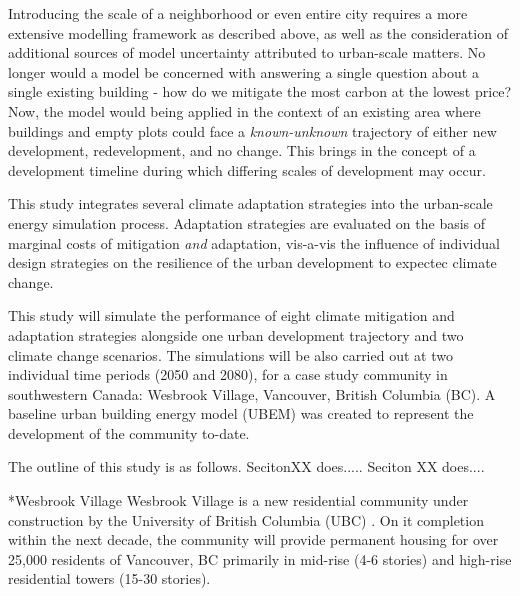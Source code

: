 \documentclass[twocolumn, a4paper,10pt]{article}
\makeatletter
\renewcommand\subsection{\@startsection{subsection}{1}{\z@}{\z@}{\z@}{\normalfont\normalsize\bfseries}}
\renewcommand\subsection{\@startsection{subsection}{1}{\z@}{\z@}{0.1pt}{\normalfont\normalsize\bfseries}}
\makeatother
\begin{document}
Introducing the scale of a neighborhood or even entire city requires a more extensive modelling framework as described above, as well as the consideration of additional sources of model uncertainty attributed to urban-scale matters. No longer would a model be concerned with answering a single question about a single existing building - how do we mitigate the most carbon at the lowest price? Now, the model would  being applied in the context of an existing area where buildings and empty plots could face a \textit{known-unknown} trajectory of either new development, redevelopment, and no change. This brings in the concept of a development timeline during which differing scales of development may occur.

This study integrates several climate adaptation strategies into the urban-scale energy simulation process. Adaptation strategies are evaluated on the basis of marginal costs of mitigation \textit{and} adaptation, vis-a-vis the influence of individual design strategies on the resilience of the urban development to expectec climate change. 

This study will simulate the performance of eight climate mitigation and adaptation strategies alongside one urban development trajectory and two climate change scenarios. The simulations will be also carried out at two individual time periods (2050 and 2080), for a case study community in southwestern Canada: Wesbrook Village, Vancouver, British Columbia (BC). A baseline urban building energy model (UBEM) was created to represent the development of the community to-date.

The outline of this study is as follows. SecitonXX does..... Seciton XX does.... 



\subsection*{Wesbrook Village} 
Wesbrook Village is a new residential community under construction by the University of British Columbia (UBC) \citep{ubc_planning_ubc_2020_SR, ubc_planning_ubc_2020_wb}. On it completion within the next decade, the community will provide permanent housing for over 25,000 residents of Vancouver, BC primarily in mid-rise (4-6 stories) and high-rise residential towers (15-30 stories). 
\end{document}
